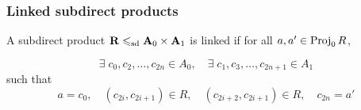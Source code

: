 \documentclass[xcolor=dvipsnames,9pt,hide notes,mathserif]{beamer}
\renewcommand{\alert}[1]{\textcolor{olivegreen}{#1}}
\begin{document}
\begin{frame}
  \frametitle{Linked subdirect products}
  A subdirect product $\mathbf{R} \leqslant_{\mathrm{sd}} \mathbf{A}_0 \times \mathbf{A}_1$ is \alert{linked} if
  for all $a, a' \in \operatorname{Proj}_0 R$,
  
  \[\exists\; c_0, c_2, \dots, c_{2n} \in A_0, \quad
  \exists\; c_1, c_3, \dots, c_{2n+1} \in A_1\]
  such that
  \[
  a = c_0, \quad
  (c_{2i},c_{2i+1})\in R,\quad
  (c_{2i+2},c_{2i+1})\in R,\quad c_{2n} = a'
  \]


  \bigskip
\end{frame}
\end{document}
